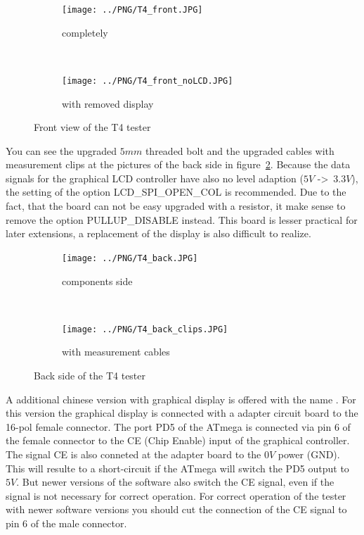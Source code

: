 \begin{figure}[H]
  \begin{subfigure}[b]{.5\textwidth}
    \centering
    \texttt{[image: ../PNG/T4\_front.JPG]}
    \caption{completely}
  \end{subfigure}
  ~
  \begin{subfigure}[b]{.5\textwidth}
    \centering
    \texttt{[image: ../PNG/T4\_front\_noLCD.JPG]}
    \caption{with removed display}
  \end{subfigure}
  \caption{Front view of the T4 tester}
  \label{fig:T4_front}
\end{figure}

You can see the upgraded \(5mm\) threaded bolt and the upgraded cables with measurement clips
at the pictures of the back side in figure~\ref{fig:T4_back}.
Because the data signals for the graphical LCD controller have also no
level adaption (\(5V\) -\textgreater~\(3.3V\)), the setting of the option LCD\_SPI\_OPEN\_COL is recommended.
Due to the fact, that the board can not be easy upgraded with a  resistor,
it make sense to remove the option PULLUP\_DISABLE instead. 
This board is lesser practical for later extensions, a replacement of the display is
also difficult to realize.

\begin{figure}[H]
  \begin{subfigure}[b]{.5\textwidth}
    \centering
    \texttt{[image: ../PNG/T4\_back.JPG]}
    \caption{components side}
  \end{subfigure}
  ~
  \begin{subfigure}[b]{.5\textwidth}
    \centering
    \texttt{[image: ../PNG/T4\_back\_clips.JPG]}
    \caption{with measurement cables}
  \end{subfigure}
  \caption{Back side of the T4 tester}
  \label{fig:T4_back}
\end{figure}

A additional chinese version with graphical display is offered with the name .
For this version the graphical display is connected with a adapter circuit board to the 16-pol female connector. 
The port PD5 of the ATmega is connected via pin 6 of the female connector to the CE (Chip Enable) input of the 
graphical controller.
The signal CE is also conneted at the adapter board to the \(0V\) power (GND).
This will resulte to a short-circuit if the ATmega will switch the PD5 output to \(5V\).
But newer versions of the software also switch the CE signal, even if the signal is not necessary for
correct operation.
For correct operation of the  tester with newer software versions you should cut the
connection of the CE signal to pin 6 of the male connector.

